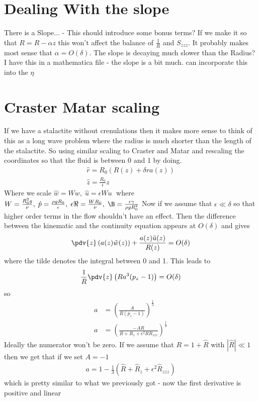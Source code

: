\documentclass[12pt]{article}
\begin{document}
	\section{Dealing With the slope} 
	
	There is a Slope... - This should introduce some bonus terms? If we make it so that $R = R -\alpha z$ this won't affect the balance of $\frac{1}{R}$ and $S_{zzz}$. It probably makes most sense that $\alpha = O(\delta)$. The slope is decaying much slower than the Radius? I have this in a mathematica file - the slope is a bit much. can incorporate this into the $\eta$
\section{Craster Matar scaling}
If we have a stalactite without crenulations then it makes more sense to think of this as a long wave problem where the radius is much shorter than the length of the stalactite. So using similar scaling to Craster and Matar \cite{CRASTER_2006} and rescaling the coordinates so that the fluid is between 0 and 1 by doing.
\begin{align}
\hat r = R_0(R(z)+\delta r a(z))\\
\hat z = \frac{R_0}{\epsilon}z
\end{align}
Where we scale $\hat w = W w,\; \hat u = \epsilon W u \;$ where $ W = \frac{ R_0^2 g}{\nu},\; \hat p = \frac{\rho g R_0}{\epsilon} , \;\epsilon \Re  = \frac{W R_0}{\nu}, \;  \B= \frac{\epsilon\gamma}{\rho g R_0^2}$
Now if we assume that $\epsilon\ll\delta$ so that higher order terms in the flow shouldn't have an effect.
Then the difference between the kinematic and the continuity equation appears at  $O(\delta)$ and gives
\begin{align}
\pdv{z}\left(a(z) \tilde w(z) \right)+ \frac{a(z)\tilde u (z)}{R(z)} =O(\delta)
\end{align}
where the tilde denotes the integral between 0 and 1.
This leads to
\begin{align}
\frac{1}{R}\pdv{z}\left(R a^3(p_z -1)\right) = O(\delta)
\end{align} 
so \begin{align}
a &=\left(\frac{A}{R(p_z-1)}\right)^{\frac{1}{3}}\\
a &=\left(\frac{-AR}{R+R_z+\epsilon^2RR_{zzz}}\right)^{\frac{1}{3}}	
\end{align}
Ideally the numerator won't be zero. If we assume that $R = 1+ \hat R$ with $|\hat R|\ll 1$ then we get that if we set $A= -1$
\begin{align}
a = 1 - \frac{1}{3} (\hat R + \hat R_z +\epsilon^2 \hat R_{zzz}) 
\end{align}
which is pretty similar to what we previously got - now the first derivative is positive and linear
\end{document}
